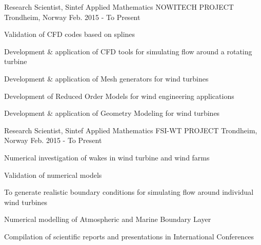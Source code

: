 \begin{cventries}
	\cventry
	{Research Scientist, Sintef Applied Mathematics} %
	{NOWITECH PROJECT} %
	{Trondheim, Norway} %
	{Feb. 2015 - To Present} %
	{
		\begin{cvitems} 
	\item{Validation of CFD codes based on splines}
	\item{ Development \& application of CFD tools for simulating flow around a rotating turbine}
	\item{Development \& application of Mesh generators for wind turbines}
	\item{Development of Reduced Order Models for wind engineering applications}
	\item{Development \& application of Geometry Modeling for wind turbines}
		\end{cvitems}
	}
  \cventry
  {Research Scientist, Sintef Applied Mathematics} %
  {FSI-WT PROJECT} %
  {Trondheim, Norway} %
  {Feb. 2015 - To Present} %
  {
  	\begin{cvitems}
\item{Numerical investigation of wakes in wind turbine and wind farms}
\item{Validation of numerical models}
\item{To generate realistic boundary conditions for simulating flow around individual wind turbines}
\item{Numerical modelling of Atmospheric and Marine Boundary Layer}
\item{Compilation of scientific reports and presentations in International Conferences}
	 \end{cvitems}
  }
\end{cventries}